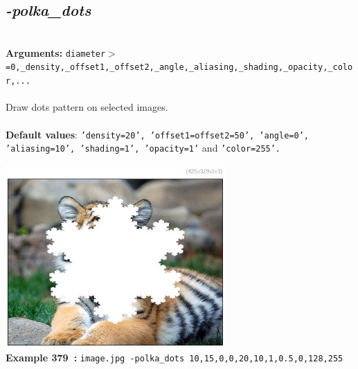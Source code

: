 \documentclass[a4paper,11pt,twoside]{book}
\begin{document}
\subsection{\emph{-polka\_dots} }\vspace*{-0.5em}
~\\\textbf{Arguments: } 
{\small \texttt{diameter$>$=0,\_density,\_offset1,\_offset2,\_angle,\_aliasing,\_shading,\_opacity,\_color,...}}\\~\\
Draw dots pattern on selected images.
~\\~\\\textbf{Default values}: {\small \texttt{'density=20', 'offset1=offset2=50', 'angle=0', 'aliasing=10', 'shading=1', 'opacity=1'} and \texttt{'color=255'.}}
\begin{center}\includegraphics[keepaspectratio=true,height=7cm,width=\textwidth]{img/gmic_def379.jpg}\\
{\footnotesize \textbf{Example 379~:} \texttt{image.jpg -polka\_dots 10,15,0,0,20,10,1,0.5,0,128,255}}
\end{center}
\end{document}
